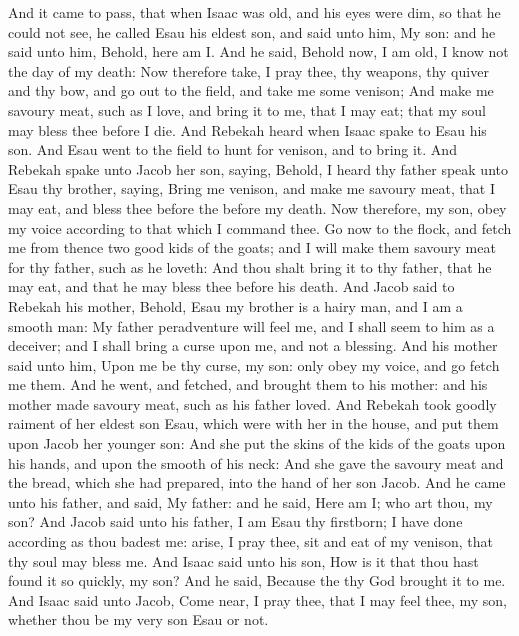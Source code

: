 \begin{biblechapter} %
\verse And it came to pass, that when Isaac was old, and his eyes were dim, so that he could not see, he called Esau his eldest son, and said unto him, My son: and he said unto him, Behold, here am I.
\verse And he said, Behold now, I am old, I know not the day of my death:
\verse Now therefore take, I pray thee, thy weapons, thy quiver and thy bow, and go out to the field, and take me some venison;
\verse And make me savoury meat, such as I love, and bring it to me, that I may eat; that my soul may bless thee before I die.
\verse And Rebekah heard when Isaac spake to Esau his son. And Esau went to the field to hunt for venison, and to bring it.
\verse And Rebekah spake unto Jacob her son, saying, Behold, I heard thy father speak unto Esau thy brother, saying,
\verse Bring me venison, and make me savoury meat, that I may eat, and bless thee before the \LORD before my death.
\verse Now therefore, my son, obey my voice according to that which I command thee.
\verse Go now to the flock, and fetch me from thence two good kids of the goats; and I will make them savoury meat for thy father, such as he loveth:
\verse And thou shalt bring it to thy father, that he may eat, and that he may bless thee before his death.
\verse And Jacob said to Rebekah his mother, Behold, Esau my brother is a hairy man, and I am a smooth man:
\verse My father peradventure will feel me, and I shall seem to him as a deceiver; and I shall bring a curse upon me, and not a blessing.
\verse And his mother said unto him, Upon me be thy curse, my son: only obey my voice, and go fetch me them.
\verse And he went, and fetched, and brought them to his mother: and his mother made savoury meat, such as his father loved.
\verse And Rebekah took goodly raiment of her eldest son Esau, which were with her in the house, and put them upon Jacob her younger son:
\verse And she put the skins of the kids of the goats upon his hands, and upon the smooth of his neck:
\verse And she gave the savoury meat and the bread, which she had prepared, into the hand of her son Jacob.
\verse And he came unto his father, and said, My father: and he said, Here am I; who art thou, my son?
\verse And Jacob said unto his father, I am Esau thy firstborn; I have done according as thou badest me: arise, I pray thee, sit and eat of my venison, that thy soul may bless me.
\verse And Isaac said unto his son, How is it that thou hast found it so quickly, my son? And he said, Because the \LORD thy God brought it to me.
\verse And Isaac said unto Jacob, Come near, I pray thee, that I may feel thee, my son, whether thou be my very son Esau or not.

\end{biblechapter}
